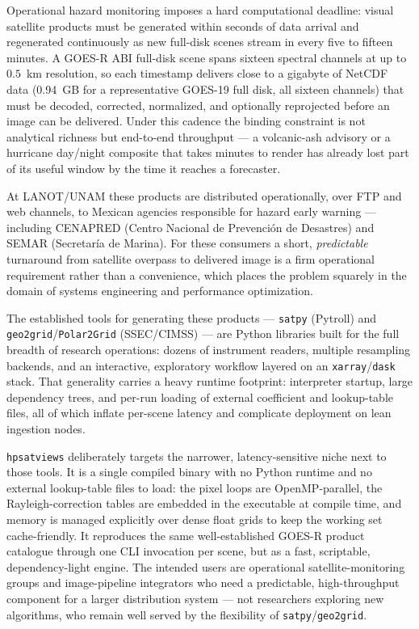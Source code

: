 \documentclass[preprint,12pt]{elsarticle}
\begin{document}
Operational hazard monitoring imposes a hard computational deadline: visual
satellite products must be generated within seconds of data arrival and
regenerated continuously as new full-disk scenes stream in every five to
fifteen minutes. A GOES-R ABI full-disk scene spans sixteen spectral channels
at up to $0.5$~km resolution, so each timestamp delivers close to a gigabyte
of NetCDF data (0.94~GB for a representative GOES-19 full disk, all sixteen
channels) that must be decoded, corrected, normalized, and
optionally reprojected before an image can be delivered. Under this cadence
the binding constraint is not analytical richness but end-to-end
throughput --- a volcanic-ash advisory or a hurricane day/night composite that
takes minutes to render has already lost part of its useful window by the time
it reaches a forecaster.

At LANOT/UNAM these products are distributed operationally, over FTP and web
channels, to Mexican agencies responsible for hazard early warning ---
including CENAPRED (Centro Nacional de Prevenci\'on de Desastres) and SEMAR
(Secretar\'ia de Marina). For these consumers a short, \emph{predictable}
turnaround from satellite overpass to delivered image is a firm operational
requirement rather than a convenience, which places the problem squarely in
the domain of systems engineering and performance optimization.

The established tools for generating these products --- \texttt{satpy}
(Pytroll) and \texttt{geo2grid}/\texttt{Polar2Grid} (SSEC/CIMSS)
\cite{Geo2Grid2026} --- are Python libraries built for the full breadth of
research operations: dozens of instrument readers, multiple resampling
backends, and an interactive, exploratory workflow layered on an
\texttt{xarray}/\texttt{dask} stack. That generality carries a heavy runtime
footprint: interpreter startup, large dependency trees, and per-run loading of
external coefficient and lookup-table files, all of which inflate per-scene
latency and complicate deployment on lean ingestion nodes.

\texttt{hpsatviews} deliberately targets the narrower, latency-sensitive niche
next to those tools. It is a single compiled binary with no Python runtime and
no external lookup-table files to load: the pixel loops are OpenMP-parallel,
the Rayleigh-correction tables are embedded in the executable at compile time,
and memory is managed explicitly over dense float grids to keep the working
set cache-friendly. It reproduces the same well-established GOES-R product
catalogue through one CLI invocation per scene, but as a fast, scriptable,
dependency-light engine. The intended users are operational
satellite-monitoring groups and image-pipeline integrators who need a
predictable, high-throughput component for a larger distribution system ---
not researchers exploring new algorithms, who remain well served by the
flexibility of \texttt{satpy}/\texttt{geo2grid}.
\end{document}
